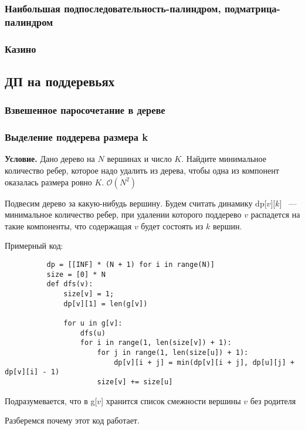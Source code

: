 \documentclass[a4paper,12pt]{article}
\begin{document}
      \subsubsection{Наибольшая подпоследовательность-палиндром, подматрица-палиндром}
      \subsubsection{Казино}

    \subsection{ДП на поддеревьях}

      \subsubsection{Взвешенное паросочетание в дереве}

      \subsubsection{Выделение поддерева размера k}
      
      \textbf{Условие.} Дано дерево на $N$ вершинах и число $K$. 
      Найдите минимальное количество ребер, которое надо удалить из дерева, 
      чтобы одна из компонент оказалась размера ровно $K$. $\mathcal{O}(N^2)$
      
      Подвесим дерево за какую-нибудь вершину. Будем считать динамику 
      dp[$v$][$k$] ~--- минимальное количество ребер, при удалении которого
      поддерево $v$ распадется на такие компоненты, что содержащая $v$
      будет состоять из $k$ вершин.
      
      Примерный код:
      \begin{lstlisting}
          dp = [[INF] * (N + 1) for i in range(N)]
          size = [0] * N
          def dfs(v):
              size[v] = 1;
              dp[v][1] = len(g[v])
    
              for u in g[v]:
                  dfs(u)
                  for i in range(1, len(size[v]) + 1):
                      for j in range(1, len(size[u]) + 1):
                          dp[v][i + j] = min(dp[v][i + j], dp[u][j] + dp[v][i] - 1) 
                      size[v] += size[u]       
      \end{lstlisting}
      Подразумевается, что в g[$v$] хранится список смежности вершины
      $v$ без родителя

      Разберемся почему этот код работает.
\end{document}
